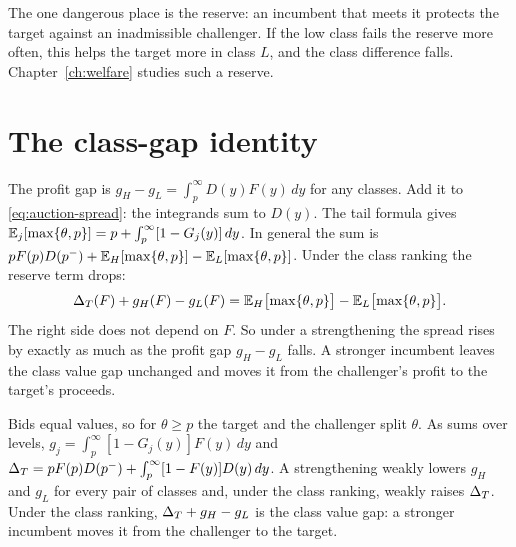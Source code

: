 \begin{intuition}[part (c)]
The one dangerous place is the reserve: an incumbent that meets it protects the target against an inadmissible challenger. If the low class fails the reserve more often, this helps the target more in class \(L\), and the class difference falls. Chapter~\ref{ch:welfare} studies such a reserve.
\end{intuition}

\section{The class-gap identity}\label{sec:auction-gap}

The profit gap is \(g_H-g_L=\int_p^\infty D(y)F(y)\,dy\) for any classes. Add it to \eqref{eq:auction-spread}: the integrands sum to \(D(y)\).
The tail formula gives \(\mathbb{E}_j[\max\{\theta,p\}]=p+\int_p^\infty[1-G_j(y)]\,dy\).
In general the sum is \(pF(p)D(p^-)+\mathbb{E}_H[\max\{\theta,p\}]-\mathbb{E}_L[\max\{\theta,p\}]\). Under the class ranking the reserve term drops:
\begin{equation}\label{eq:auction-gap}
\Delta_T(F)+g_H(F)-g_L(F)=\mathbb{E}_H\bigl[\max\{\theta,p\}\bigr]-\mathbb{E}_L\bigl[\max\{\theta,p\}\bigr].
\end{equation}
The right side does not depend on \(F\). So under a strengthening the spread rises by exactly as much as the profit gap \(g_H-g_L\) falls.
A stronger incumbent leaves the class value gap unchanged and moves it from the challenger's profit to the target's proceeds.

\begin{chaptersummary}
Bids equal values, so for \(\theta\ge p\) the target and the challenger split \(\theta\). As sums over levels, \(g_j=\int_p^\infty[1-G_j(y)]F(y)\,dy\) and \(\Delta_T=pF(p)D(p^-)+\int_p^\infty[1-F(y)]D(y)\,dy\).
A strengthening weakly lowers \(g_H\) and \(g_L\) for every pair of classes and, under the class ranking, weakly raises \(\Delta_T\).
Under the class ranking, \(\Delta_T+g_H-g_L\) is the class value gap: a stronger incumbent moves it from the challenger to the target.
\end{chaptersummary}
